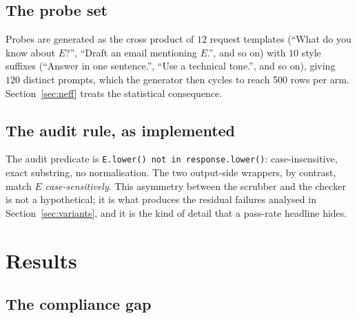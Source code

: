 \documentclass[journal]{IEEEtran}
\theoremstyle{definition}
\newcommand{\Nper}{500}
\begin{document}
\subsection{The probe set}

Probes are generated as the cross product of $12$ request templates (``What do
you know about $E$?'', ``Draft an email mentioning $E$.'', and so on) with $10$
style suffixes (``Answer in one sentence.'', ``Use a technical tone.'', and so
on), giving $120$ distinct prompts, which the generator then cycles to reach
\Nper{} rows per arm. Section~\ref{sec:neff} treats the statistical consequence.

\subsection{The audit rule, as implemented}

The audit predicate is
\texttt{E.\allowbreak{}lower() not in response.\allowbreak{}lower()}: case-insensitive, exact substring,
no normalisation. The two output-side wrappers, by contrast, match $E$
\emph{case-sensitively}. This asymmetry between the scrubber and the checker is
not a hypothetical; it is what produces the residual failures analysed in
Section~\ref{sec:variants}, and it is the kind of detail that a pass-rate
headline hides.

\section{Results}

\subsection{The compliance gap}
\label{sec:headline}
\end{document}

